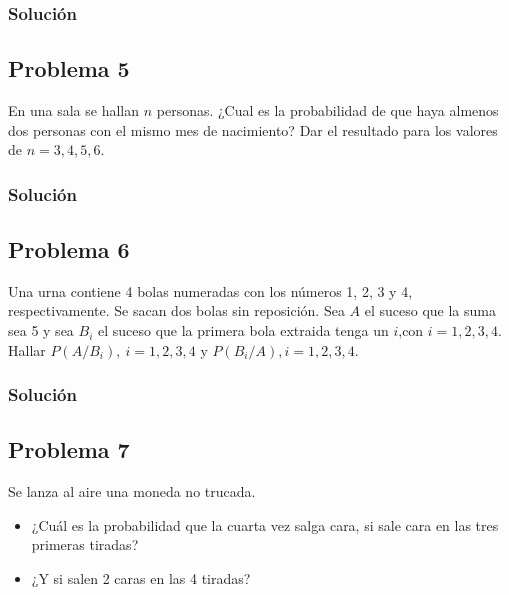 \documentclass[
]{article}
\providecommand{\tightlist}{%
  \setlength{\itemsep}{0pt}\setlength{\parskip}{0pt}}
\begin{document}
\hypertarget{soluciuxf3n-3}{%
\subsubsection{Solución}\label{soluciuxf3n-3}}

\hypertarget{problema-5}{%
\subsection{Problema 5}\label{problema-5}}

En una sala se hallan \(n\) personas. ¿Cual es la probabilidad de que
haya almenos dos personas con el mismo mes de nacimiento? Dar el
resultado para los valores de \(n=3,4,5,6\).

\hypertarget{soluciuxf3n-4}{%
\subsubsection{Solución}\label{soluciuxf3n-4}}

\hypertarget{problema-6}{%
\subsection{Problema 6}\label{problema-6}}

Una urna contiene 4 bolas numeradas con los números 1, 2, 3 y 4,
respectivamente. Se sacan dos bolas sin reposición. Sea \(A\) el suceso
que la suma sea 5 y sea \(B_i\) el suceso que la primera bola extraida
tenga un \(i\),con \(i=1,2,3,4\). Hallar \(P(A/B_i),\  i=1,2,3,4\) y
\(P(B_i/A), i=1,2,3,4\).

\hypertarget{soluciuxf3n-5}{%
\subsubsection{Solución}\label{soluciuxf3n-5}}

\hypertarget{problema-7}{%
\subsection{Problema 7}\label{problema-7}}

Se lanza al aire una moneda no trucada.

\begin{itemize}
\tightlist
\item
  ¿Cuál es la probabilidad que la cuarta vez salga cara, si sale cara en
  las tres primeras tiradas?
\item
  ¿Y si salen 2 caras en las 4 tiradas?
\end{itemize}
\end{document}
